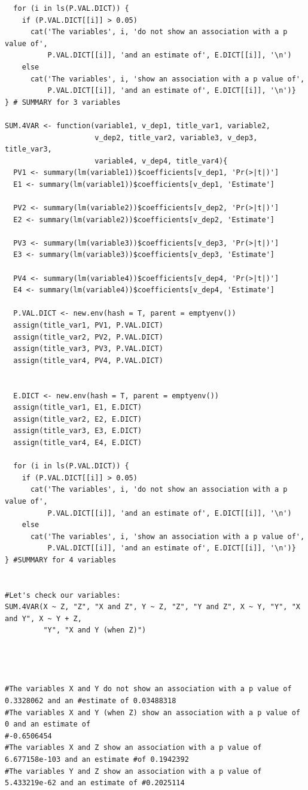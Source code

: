 \documentclass{article}
\begin{document}
\begin{lstlisting}
  for (i in ls(P.VAL.DICT)) {
    if (P.VAL.DICT[[i]] > 0.05)
      cat('The variables', i, 'do not show an association with a p value of',  
          P.VAL.DICT[[i]], 'and an estimate of', E.DICT[[i]], '\n')
    else
      cat('The variables', i, 'show an association with a p value of',  
          P.VAL.DICT[[i]], 'and an estimate of', E.DICT[[i]], '\n')}
} # SUMMARY for 3 variables

SUM.4VAR <- function(variable1, v_dep1, title_var1, variable2, 
                     v_dep2, title_var2, variable3, v_dep3, title_var3, 
                     variable4, v_dep4, title_var4){
  PV1 <- summary(lm(variable1))$coefficients[v_dep1, 'Pr(>|t|)']
  E1 <- summary(lm(variable1))$coefficients[v_dep1, 'Estimate']
  
  PV2 <- summary(lm(variable2))$coefficients[v_dep2, 'Pr(>|t|)']
  E2 <- summary(lm(variable2))$coefficients[v_dep2, 'Estimate']
  
  PV3 <- summary(lm(variable3))$coefficients[v_dep3, 'Pr(>|t|)']
  E3 <- summary(lm(variable3))$coefficients[v_dep3, 'Estimate']
  
  PV4 <- summary(lm(variable4))$coefficients[v_dep4, 'Pr(>|t|)']
  E4 <- summary(lm(variable4))$coefficients[v_dep4, 'Estimate']
  
  P.VAL.DICT <- new.env(hash = T, parent = emptyenv())
  assign(title_var1, PV1, P.VAL.DICT)
  assign(title_var2, PV2, P.VAL.DICT)
  assign(title_var3, PV3, P.VAL.DICT)
  assign(title_var4, PV4, P.VAL.DICT)
  
  
  E.DICT <- new.env(hash = T, parent = emptyenv())
  assign(title_var1, E1, E.DICT)
  assign(title_var2, E2, E.DICT)
  assign(title_var3, E3, E.DICT)
  assign(title_var4, E4, E.DICT)
  
  for (i in ls(P.VAL.DICT)) {
    if (P.VAL.DICT[[i]] > 0.05)
      cat('The variables', i, 'do not show an association with a p value of',  
          P.VAL.DICT[[i]], 'and an estimate of', E.DICT[[i]], '\n')
    else
      cat('The variables', i, 'show an association with a p value of',  
          P.VAL.DICT[[i]], 'and an estimate of', E.DICT[[i]], '\n')}
} #SUMMARY for 4 variables


#Let's check our variables:
SUM.4VAR(X ~ Z, "Z", "X and Z", Y ~ Z, "Z", "Y and Z", X ~ Y, "Y", "X and Y", X ~ Y + Z, 
         "Y", "X and Y (when Z)")
         
         
         
         
#The variables X and Y do not show an association with a p value of 0.3328062 and an #estimate of 0.03488318 
#The variables X and Y (when Z) show an association with a p value of 0 and an estimate of 
#-0.6506454 
#The variables X and Z show an association with a p value of 6.677158e-103 and an estimate #of 0.1942392 
#The variables Y and Z show an association with a p value of 5.433219e-62 and an estimate of #0.2025114



\end{lstlisting}
\end{document}
